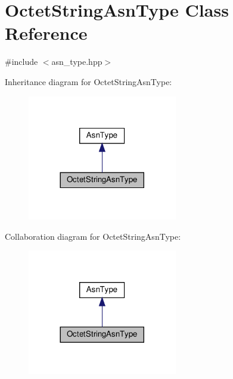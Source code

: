 \hypertarget{classOctetStringAsnType}{}\section{Octet\+String\+Asn\+Type Class Reference}
\label{classOctetStringAsnType}


{\ttfamily \#include $<$asn\+\_\+type.\+hpp$>$}



Inheritance diagram for Octet\+String\+Asn\+Type\+:
\nopagebreak
\begin{figure}[H]
\begin{center}
\leavevmode
\includegraphics[width=185pt]{d1/d91/classOctetStringAsnType__inherit__graph}
\end{center}
\end{figure}


Collaboration diagram for Octet\+String\+Asn\+Type\+:
\nopagebreak
\begin{figure}[H]
\begin{center}
\leavevmode
\includegraphics[width=185pt]{d9/dea/classOctetStringAsnType__coll__graph}
\end{center}
\end{figure}
